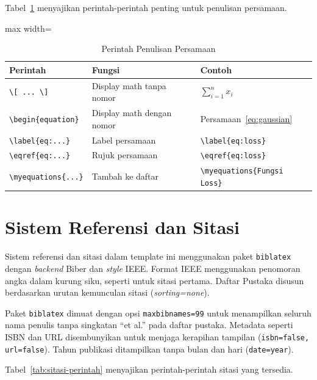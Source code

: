 Tabel~\ref{tab:math-commands} menyajikan perintah-perintah penting untuk penulisan persamaan.

\begin{table}[h]
  \centering
  \caption{Perintah Penulisan Persamaan}
  \label{tab:math-commands}
  \begin{adjustbox}{max width=\textwidth}
  \begin{tabular}{llp{5cm}}
    \toprule
    \textbf{Perintah} & \textbf{Fungsi} & \textbf{Contoh} \\
    \midrule
    \texttt{\textbackslash [ ... \textbackslash ]} & Display math tanpa nomor & $\displaystyle \sum_{i=1}^{n} x_i$ \\
    \texttt{\textbackslash begin\{equation\}} & Display math dengan nomor & Persamaan~\eqref{eq:gaussian} \\
    \texttt{\textbackslash label\{eq:...\}} & Label persamaan & \texttt{\textbackslash label\{eq:loss\}} \\
    \texttt{\textbackslash eqref\{eq:...\}} & Rujuk persamaan & \texttt{\textbackslash eqref\{eq:loss\}} \\
    \texttt{\textbackslash myequations\{...\}} & Tambah ke daftar & \texttt{\textbackslash myequations\{Fungsi Loss\}} \\
    \bottomrule
  \end{tabular}
  \end{adjustbox}
\end{table}

\section{Sistem Referensi dan Sitasi}

Sistem referensi dan sitasi dalam template ini menggunakan paket \texttt{biblatex} dengan \textit{backend} Biber dan \textit{style} IEEE. Format IEEE menggunakan penomoran angka dalam kurung siku, seperti \cite{Zhou2025} untuk sitasi pertama. Daftar Pustaka disusun berdasarkan urutan kemunculan sitasi (\textit{sorting=none}).

Paket \texttt{biblatex} dimuat dengan opsi \texttt{maxbibnames=99} untuk menampilkan seluruh nama penulis tanpa singkatan ``et al.'' pada daftar pustaka. Metadata seperti ISBN dan URL disembunyikan untuk menjaga kerapihan tampilan (\texttt{isbn=false, url=false}). Tahun publikasi ditampilkan tanpa bulan dan hari (\texttt{date=year}).

Tabel~\ref{tab:sitasi-perintah} menyajikan perintah-perintah sitasi yang tersedia.

